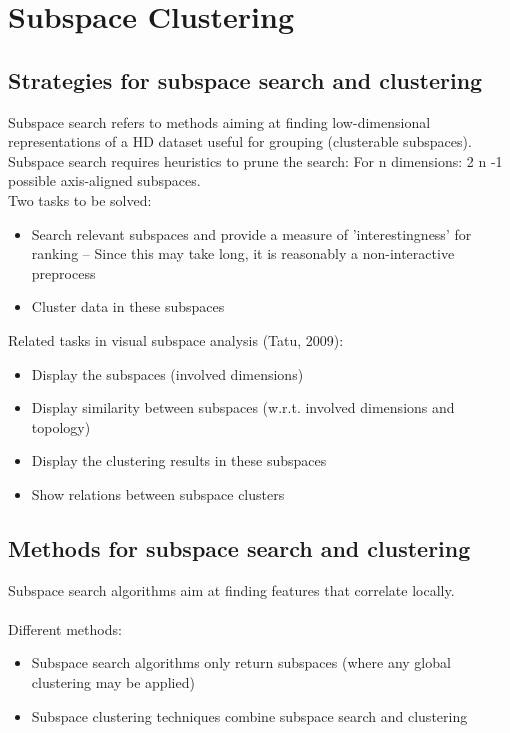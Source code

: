 \documentclass[11pt,ngerman]{article}
\begin{document}
\section{Subspace Clustering}
\subsection{Strategies for subspace search and clustering}

Subspace search refers to methods aiming at finding
low-dimensional representations of a HD dataset useful
for grouping (clusterable subspaces).\\
Subspace search requires heuristics to prune the search:
For n dimensions: 2 n -1 possible axis-aligned subspaces.\\

Two tasks to be solved:
\begin{itemize}
\item Search relevant subspaces and provide a measure
of 'interestingness' for ranking
– Since this may take long, it is reasonably a non-interactive
preprocess
\item Cluster data in these subspaces
\end{itemize}

Related tasks in visual subspace analysis (Tatu, 2009):
\begin{itemize}
\item Display the subspaces (involved dimensions)
\item Display similarity between subspaces (w.r.t. involved
dimensions and topology)
\item Display the clustering results in these subspaces
\item Show relations between subspace clusters
\end{itemize}

\subsection{ Methods for subspace search and clustering}
Subspace search algorithms aim at finding features
that correlate locally.\\\\
Different methods:
\begin{itemize}
\item Subspace search algorithms only return subspaces (where
any global clustering may be applied)
\item Subspace clustering techniques combine subspace search and clustering
\end{itemize}
\end{document}
